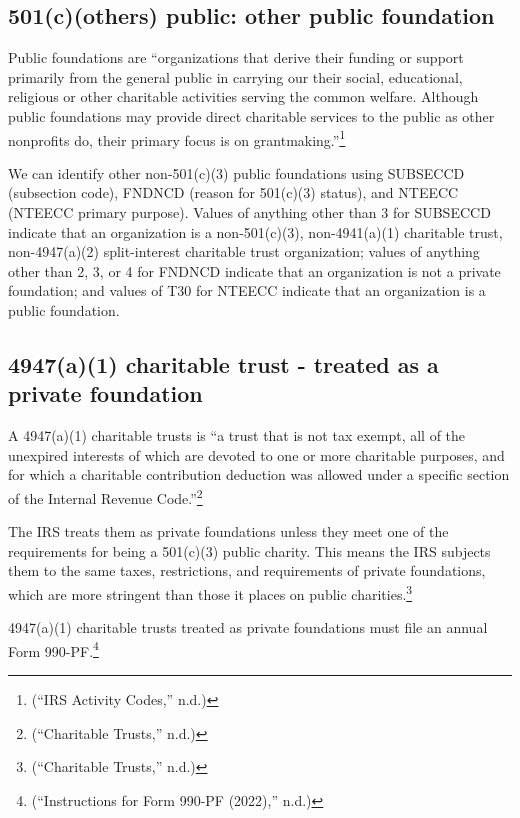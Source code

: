 \documentclass[
  letterpaper,
  DIV=11,
  numbers=noendperiod,
  oneside]{scrreprt}
\begin{document}
\hypertarget{cothers-public-other-public-foundation}{%
\subsection{501(c)(others) public: other public
foundation}\label{cothers-public-other-public-foundation}}

Public foundations are ``organizations that derive their funding or
support primarily from the general public in carrying our their social,
educational, religious or other charitable activities serving the common
welfare. Although public foundations may provide direct charitable
services to the public as other nonprofits do, their primary focus is on
grantmaking.''\footnote{({``IRS Activity Codes,''} n.d.)}

We can identify other non-501(c)(3) public foundations using SUBSECCD
(subsection code), FNDNCD (reason for 501(c)(3) status), and NTEECC
(NTEECC primary purpose). Values of anything other than 3 for SUBSECCD
indicate that an organization is a non-501(c)(3), non-4941(a)(1)
charitable trust, non-4947(a)(2) split-interest charitable trust
organization; values of anything other than 2, 3, or 4 for FNDNCD
indicate that an organization is not a private foundation; and values of
T30 for NTEECC indicate that an organization is a public foundation.

\hypertarget{a1-charitable-trust---treated-as-a-private-foundation}{%
\subsection{4947(a)(1) charitable trust - treated as a private
foundation}\label{a1-charitable-trust---treated-as-a-private-foundation}}

A 4947(a)(1) charitable trusts is ``a trust that is not tax exempt, all
of the unexpired interests of which are devoted to one or more
charitable purposes, and for which a charitable contribution deduction
was allowed under a specific section of the Internal Revenue
Code.''\footnote{({``Charitable Trusts,''} n.d.)}

The IRS treats them as private foundations unless they meet one of the
requirements for being a 501(c)(3) public charity. This means the IRS
subjects them to the same taxes, restrictions, and requirements of
private foundations, which are more stringent than those it places on
public charities.\footnote{({``Charitable Trusts,''} n.d.)}

4947(a)(1) charitable trusts treated as private foundations must file an
annual Form 990-PF.\footnote{({``Instructions for Form 990-PF (2022),''}
  n.d.)}
\end{document}

